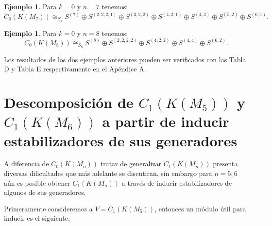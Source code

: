 \documentclass[12pt]{book}
\theoremstyle{definition}
\newtheorem{example}[theorem]{Ejemplo}
\newcounter{in}
\begin{document}
\begin{example}
Para $k =0$ y $n = 7$ tenemos:
\begin{equation}
C_{0}(K(M_{7})) \cong_{S_{7}}  S^{(7)} \oplus S^{(2,2,2,1)} \oplus S^{(3,2,2)} \oplus S^{(4,2,1)} \oplus S^{(4,3)} \oplus S^{(5,2)} \oplus S^{(6,1)}.
\end{equation}
\end{example}
\begin{example}
Para $k =0$ y $n = 8$ tenemos:
\begin{equation}
C_{0}(K(M_{8})) \cong_{S_{8}}  S^{(8)} \oplus S^{(2,2,2,2)} \oplus S^{(4,2,2)} \oplus S^{(4,4)} \oplus S^{(6,2)}.
\end{equation}
\end{example}
Los resultados de los dos ejemplos anteriores pueden ser verificados con las Tabla D y Tabla E respectivamente en el Apéndice A.

\section{Descomposición de $C_{1}(K(M_5))$ y $C_{1}(K(M_6))$ a partir de inducir estabilizadores de sus generadores}

\label{Ind_est_o}

A diferencia de $C_{0}(K(M_n))$ tratar de generalizar $C_{1}(K(M_n))$ presenta diversas dificultades que más adelante se discutiran, sin embargo para $n = 5, 6$ aún es posible obtener $C_{1}(K(M_n))$ a través de inducir estabilizadores de algunos de sus generadores.

Primeramente consideremos a $V = C_{1}(K(M_5))$, entonces un módulo útil para inducir es el siguiente:
\end{document}
